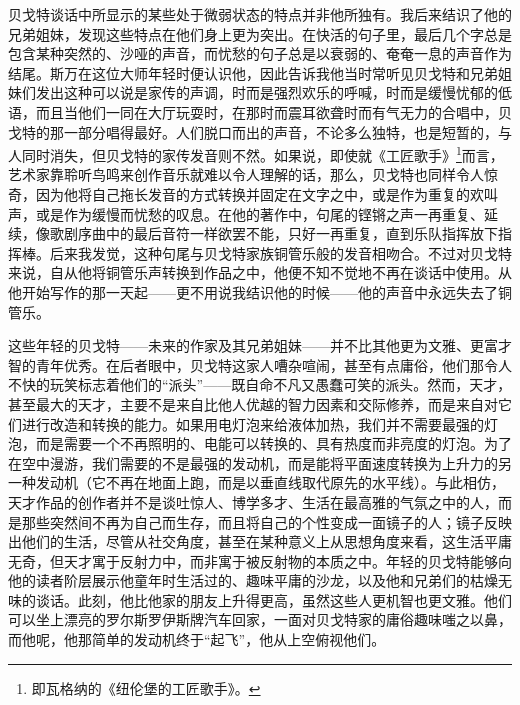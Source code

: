 \par 贝戈特谈话中所显示的某些处于微弱状态的特点并非他所独有。我后来结识了他的兄弟姐妹，发现这些特点在他们身上更为突出。在快活的句子里，最后几个字总是包含某种突然的、沙哑的声音，而忧愁的句子总是以衰弱的、奄奄一息的声音作为结尾。斯万在这位大师年轻时便认识他，因此告诉我他当时常听见贝戈特和兄弟姐妹们发出这种可以说是家传的声调，时而是强烈欢乐的呼喊，时而是缓慢忧郁的低语，而且当他们一同在大厅玩耍时，在那时而震耳欲聋时而有气无力的合唱中，贝戈特的那一部分唱得最好。人们脱口而出的声音，不论多么独特，也是短暂的，与人同时消失，但贝戈特的家传发音则不然。如果说，即使就《工匠歌手》\footnote{即瓦格纳的《纽伦堡的工匠歌手》。}而言，艺术家靠聆听鸟鸣来创作音乐就难以令人理解的话，那么，贝戈特也同样令人惊奇，因为他将自己拖长发音的方式转换并固定在文字之中，或是作为重复的欢叫声，或是作为缓慢而忧愁的叹息。在他的著作中，句尾的铿锵之声一再重复、延续，像歌剧序曲中的最后音符一样欲罢不能，只好一再重复，直到乐队指挥放下指挥棒。后来我发觉，这种句尾与贝戈特家族铜管乐般的发音相吻合。不过对贝戈特来说，自从他将铜管乐声转换到作品之中，他便不知不觉地不再在谈话中使用。从他开始写作的那一天起——更不用说我结识他的时候——他的声音中永远失去了铜管乐。
\par 这些年轻的贝戈特——未来的作家及其兄弟姐妹——并不比其他更为文雅、更富才智的青年优秀。在后者眼中，贝戈特这家人嘈杂喧闹，甚至有点庸俗，他们那令人不快的玩笑标志着他们的“派头”——既自命不凡又愚蠢可笑的派头。然而，天才，甚至最大的天才，主要不是来自比他人优越的智力因素和交际修养，而是来自对它们进行改造和转换的能力。如果用电灯泡来给液体加热，我们并不需要最强的灯泡，而是需要一个不再照明的、电能可以转换的、具有热度而非亮度的灯泡。为了在空中漫游，我们需要的不是最强的发动机，而是能将平面速度转换为上升力的另一种发动机（它不再在地面上跑，而是以垂直线取代原先的水平线）。与此相仿，天才作品的创作者并不是谈吐惊人、博学多才、生活在最高雅的气氛之中的人，而是那些突然间不再为自己而生存，而且将自己的个性变成一面镜子的人；镜子反映出他们的生活，尽管从社交角度，甚至在某种意义上从思想角度来看，这生活平庸无奇，但天才寓于反射力中，而非寓于被反射物的本质之中。年轻的贝戈特能够向他的读者阶层展示他童年时生活过的、趣味平庸的沙龙，以及他和兄弟们的枯燥无味的谈话。此刻，他比他家的朋友上升得更高，虽然这些人更机智也更文雅。他们可以坐上漂亮的罗尔斯罗伊斯牌汽车回家，一面对贝戈特家的庸俗趣味嗤之以鼻，而他呢，他那简单的发动机终于“起飞”，他从上空俯视他们。
